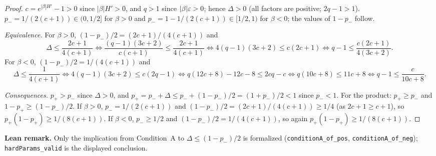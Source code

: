 \begin{proof}
\leanok
{}
$c = e^{|\beta|H'} - 1 > 0$ since $|\beta| H' > 0$, and $q > 1$ since $|\beta|\varepsilon > 0$; hence
$\Delta > 0$ (all factors are positive; $2q - 1 > 1$). $p_- = 1/(2(c+1)) \in (0, 1/2]$ for
$\beta > 0$ and $p_- = 1 - 1/(2(c+1)) \in [1/2, 1)$ for $\beta < 0$; the values of $1 - p_-$ follow.

\emph{Equivalence.} For $\beta > 0$, $(1-p_-)/2 = (2c+1)/(4(c+1))$ and
\[
  \Delta \le \frac{2c+1}{4(c+1)} \iff \frac{(q-1)(3c+2)}{c(c+1)} \le \frac{2c+1}{4(c+1)}
  \iff 4(q-1)(3c+2) \le c(2c+1) \iff q - 1 \le \frac{c(2c+1)}{4(3c+2)} .
\]
For $\beta < 0$, $(1-p_-)/2 = 1/(4(c+1))$ and
\[
  \Delta \le \frac{1}{4(c+1)} \iff 4(q-1)(3c+2) \le c(2q-1) \iff q(12c + 8) - 12c - 8 \le 2cq - c
  \iff q(10c + 8) \le 11c + 8 \iff q - 1 \le \frac{c}{10c+8} .
\]

\emph{Consequences.} $p_+ > p_-$ since $\Delta > 0$, and $p_+ = p_- + \Delta \le p_- + (1-p_-)/2 = (1+p_-)/2 < 1$
since $p_- < 1$. For the product: $p_+ \ge p_-$ and $1 - p_+ \ge (1 - p_-)/2$. If $\beta > 0$,
$p_- = 1/(2(c+1))$ and $(1-p_-)/2 = (2c+1)/(4(c+1)) \ge 1/4$ (as $2c + 1 \ge c + 1$), so
$p_+(1-p_+) \ge 1/(8(c+1))$. If $\beta < 0$, $p_- \ge 1/2$ and $(1-p_-)/2 = 1/(4(c+1))$, so again
$p_+(1-p_+) \ge 1/(8(c+1))$.
\end{proof}

\textbf{Lean remark.} Only the implication from Condition~A to $\Delta \le (1 - p_-)/2$ is formalized
(\texttt{conditionA\_of\_pos}, \texttt{conditionA\_of\_neg}); \texttt{hardParams\_valid} is the displayed
conclusion.


